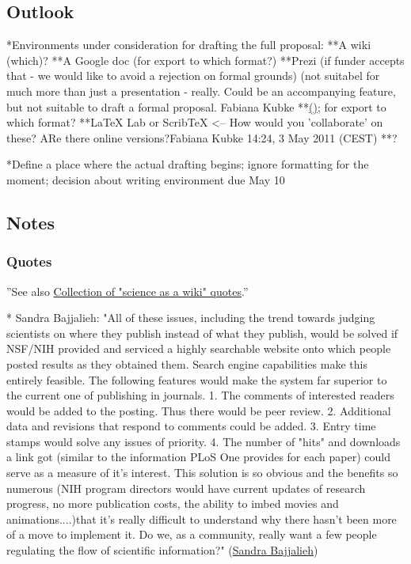\documentclass[final,authoryear,3p]{elsarticle-open-drafting}
\begin{document}
\subsection{Outlook}



*Environments under consideration for drafting the full proposal:
**A wiki (which)?
**A Google doc (for export to which format?)
**Prezi (if funder accepts that - we would like to avoid a rejection on formal grounds) (not suitabel for much more than just a presentation - really. Could be an accompanying feature, but not suitable to draft a formal proposal. Fabiana Kubke
**\href{https://github.com/Daniel-Mietchen/Open-Research-Proposals GitHub} (\href{http://marciovm.com/i-want-a-github-of-science background}); for export to which format?
**LaTeX Lab or ScribTeX <-- How would you 'collaborate' on these? ARe there online versions?Fabiana Kubke 14:24, 3 May 2011 (CEST)
**?

*Define a place where the actual drafting begins; ignore formatting for the moment; decision about writing environment due May 10

\subsection{Notes}

\subsubsection{Quotes}
''See also \href{http://www.science3point0.com/coaspedia/index.php/User:Daniel_Mietchen/Talks/Slides/Quotes}{Collection of "science as a wiki" quotes}.''

* Sandra Bajjalieh: "All of these issues, including the trend towards judging scientists on where they publish instead of what they publish, would be solved if NSF/NIH provided and serviced a highly searchable website onto which people posted results as they obtained them. Search engine capabilities make this entirely feasible. The following features would make the system far superior to the current one of publishing in journals. 1. The comments of interested readers would be added to the posting. Thus there would be peer review. 2. Additional data and revisions that respond to comments could be added. 3. Entry time stamps would solve any issues of priority. 4. The number of "hits" and downloads a link got (similar to the information PLoS One provides for each paper) could serve as a measure of it's interest. This solution is so obvious and the benefits so numerous (NIH program directors would have current updates of research progress, no more publication costs, the ability to imbed movies and animations....)that it's really difficult to understand why there hasn't been more of a move to implement it. Do we, as a community, really want a few people regulating the flow of scientific information?" (\href{http://www.nature.com/news/2011/110427/full/472391a.html}{Sandra Bajjalieh})
\end{document}
